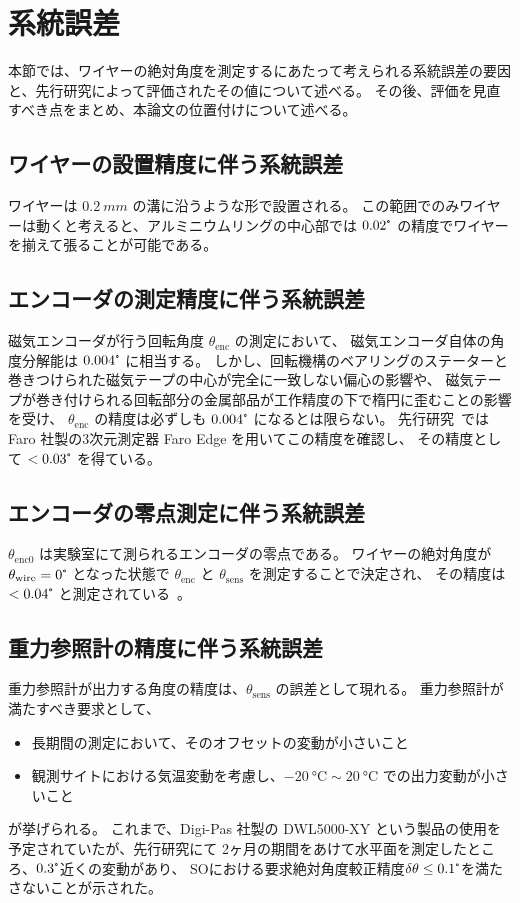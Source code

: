 \documentclass[../../main.tex]{subfiles}
\begin{document}
\section{系統誤差}
本節では、ワイヤーの絶対角度を測定するにあたって考えられる系統誤差の要因と、先行研究によって評価されたその値について述べる。
その後、評価を見直すべき点をまとめ、本論文の位置付けについて述べる。
\subsection{ワイヤーの設置精度に伴う系統誤差}
ワイヤーは $\SI{0.2}{mm}$ の溝に沿うような形で設置される。
この範囲でのみワイヤーは動くと考えると、アルミニウムリングの中心部では $0.02\tcdegree$ の精度でワイヤーを揃えて張ることが可能である。
\subsection{エンコーダの測定精度に伴う系統誤差}
磁気エンコーダが行う回転角度 $\theta_{\mathrm{enc}}$ の測定において、
磁気エンコーダ自体の角度分解能は $0.004\tcdegree$ に相当する。
しかし、回転機構のベアリングのステーターと巻きつけられた磁気テープの中心が完全に一致しない偏心の影響や、
磁気テープが巻き付けられる回転部分の金属部品が工作精度の下で楕円に歪むことの影響を受け、
$\theta_{\mathrm{enc}}$ の精度は必ずしも $0.004\tcdegree$ になるとは限らない。
先行研究~\cite{swg:iijima}では Faro 社製の3次元測定器 Faro Edge を用いてこの精度を確認し、
その精度として $< 0.03\tcdegree$ を得ている。
\subsection{エンコーダの零点測定に伴う系統誤差}
$\theta_{\mathrm{enc}0}$ は実験室にて測られるエンコーダの零点である。
ワイヤーの絶対角度が $\theta_{\mathrm{wire}} = 0\tcdegree$ となった状態で $\theta_{\mathrm{enc}}$ と $\theta_{\mathrm{sens}}$ を測定することで決定され、
その精度は $< 0.04\tcdegree$ と測定されている~\cite{swg:iijima}。\\

\subsection{重力参照計の精度に伴う系統誤差}
重力参照計が出力する角度の精度は、$\theta_{\mathrm{sens}}$ の誤差として現れる。
重力参照計が満たすべき要求として、
\begin{itemize}
    \item 長期間の測定において、そのオフセットの変動が小さいこと
    \item 観測サイトにおける気温変動を考慮し、$\SI{-20}{\degreeCelsius}\sim\SI{20}{\degreeCelsius}$ での出力変動が小さいこと
\end{itemize}
が挙げられる。
これまで、Digi-Pas 社製の DWL5000-XY という製品の使用を予定されていたが、先行研究\cite{swg:iijima}にて
2ヶ月の期間をあけて水平面を測定したところ、$0.3\tcdegree$近くの変動があり、
SOにおける要求絶対角度較正精度$\delta\theta \leq 0.1\tcdegree$を満たさないことが示された。
\end{document}
